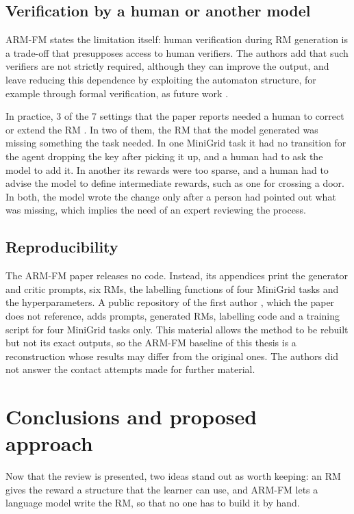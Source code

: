 \documentclass[11pt,english,listoffigures,listoftables]{tfgetsinf}
\begin{document}
\subsection{Verification by a human or another model}
ARM-FM states the limitation itself: human verification during RM generation is a trade-off that presupposes access to human verifiers. The authors add that such verifiers are not strictly required, although they can improve the output, and leave reducing this dependence by exploiting the automaton structure, for example through formal verification, as future work \cite[pp.~9--10]{creus2026armfm}. 

In practice, 3 of the 7 settings that the paper reports needed a human to correct or extend the RM \cite[p.~20]{creus2026armfm}. In two of them, the RM that the model generated was missing something the task needed. In one MiniGrid task it had no transition for the agent dropping the key after picking it up, and a human had to ask the model to add it. In another its rewards were too sparse, and a human had to advise the model to define intermediate rewards, such as one for crossing a door. In both, the model wrote the change only after a person had pointed out what was missing, which implies the need of an expert reviewing the process.

\subsection{Reproducibility}
The ARM-FM paper releases no code. Instead, its appendices print the generator and critic prompts, six RMs, the labelling functions of four MiniGrid tasks and the hyperparameters. A public repository of the first author \cite{armfm_code}, which the paper does not reference, adds prompts, generated RMs, labelling code and a training script for four MiniGrid tasks only. This material allows the method to be rebuilt but not its exact outputs, so the ARM-FM baseline of this thesis is a reconstruction whose results may differ from the original ones. The authors did not answer the contact attempts made for further material.

\section{Conclusions and proposed approach}
\label{sec:proposal}
Now that the review is presented, two ideas stand out as worth keeping: an RM gives the reward a structure that the learner can use, and ARM-FM lets a language model write the RM, so that no one has to build it by hand. 
\end{document}
